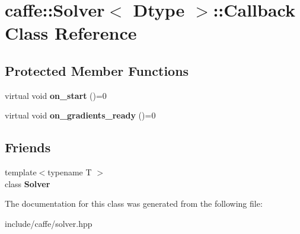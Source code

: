 \hypertarget{classcaffe_1_1Solver_1_1Callback}{}\section{caffe\+:\+:Solver$<$ Dtype $>$\+:\+:Callback Class Reference}
\label{classcaffe_1_1Solver_1_1Callback}
\subsection*{Protected Member Functions}
\begin{DoxyCompactItemize}
\item 
virtual void {\bfseries on\+\_\+start} ()=0\hypertarget{classcaffe_1_1Solver_1_1Callback_a4af79b534a8323a9fae9d5b0bceb8525}{}\label{classcaffe_1_1Solver_1_1Callback_a4af79b534a8323a9fae9d5b0bceb8525}

\item 
virtual void {\bfseries on\+\_\+gradients\+\_\+ready} ()=0\hypertarget{classcaffe_1_1Solver_1_1Callback_a6c21ab833db14756dde845065752202b}{}\label{classcaffe_1_1Solver_1_1Callback_a6c21ab833db14756dde845065752202b}

\end{DoxyCompactItemize}
\subsection*{Friends}
\begin{DoxyCompactItemize}
\item 
{\footnotesize template$<$typename T $>$ }\\class {\bfseries Solver}\hypertarget{classcaffe_1_1Solver_1_1Callback_a135ddf4017f9df930c2790f5e40d46dc}{}\label{classcaffe_1_1Solver_1_1Callback_a135ddf4017f9df930c2790f5e40d46dc}

\end{DoxyCompactItemize}


The documentation for this class was generated from the following file\+:\begin{DoxyCompactItemize}
\item 
include/caffe/solver.\+hpp\end{DoxyCompactItemize}
